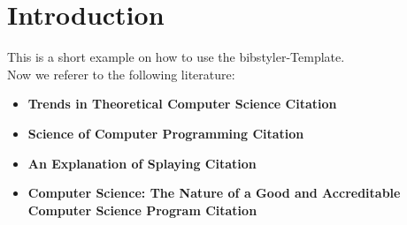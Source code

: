 \documentclass[a4paper,12pt]{scrartcl}
\newcommand\lit[1]{Citation \cite{#1}}
\begin{document}
\tableofcontents
\newpage

\section{Introduction}
This is a short example on how to use the bibstyler-Template. \\
Now we referer to the following literature:

\begin{itemize}
 \item{\bf Trends in Theoretical Computer Science \lit{boerger_trends83}}
 \item{\bf Science of Computer Programming \lit{SCP}}
 \item{\bf An Explanation of Splaying \lit{Subramanian:1994:ES}}
 \item{\bf Computer Science: The Nature of a Good and Accreditable Computer Science Program \lit{Martin96}}
\end{itemize}

\newpage

\newpage
{}
{}
\printbibliography[maxnames=99]
\end{document}
